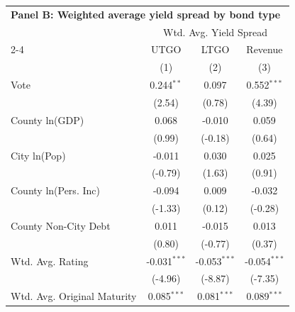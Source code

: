 \begingroup
\centering
\begin{tabular*}{\textwidth}{@{\extracolsep{\fill}}lccc}
\multicolumn{4}{l}{\textbf{Panel B: Weighted average yield spread by bond type}}\\

\addlinespace
   \toprule
 & \multicolumn{3}{c}{Wtd. Avg. Yield Spread}\\
   \cmidrule(lr){2-4}
                               & UTGO                          & LTGO                          & Revenue \\   
                               & (1)                           & (2)                           & (3)\\  
   \midrule 
   Vote                        & 0.244$^{**}$                  & 0.097                         & 0.552$^{***}$\\   
                               & (2.54)                       & (0.78)                       & (4.39)\\   
   County ln(GDP)              & 0.068                         & -0.010                        & 0.059\\   
                               & (0.99)                       & (-0.18)                      & (0.64)\\   
   City ln(Pop)                & -0.011                        & 0.030                         & 0.025\\   
                               & (-0.79)                      & (1.63)                       & (0.91)\\   
   County ln(Pers. Inc)        & -0.094                        & 0.009                         & -0.032\\   
                               & (-1.33)                      & (0.12)                       & (-0.28)\\   
   County Non-City Debt        & 0.011                         & -0.015                        & 0.013\\   
                               & (0.80)                       & (-0.77)                      & (0.37)\\   
   Wtd. Avg. Rating            & -0.031$^{***}$                & -0.053$^{***}$                & -0.054$^{***}$\\   
                               & (-4.96)                      & (-8.87)                      & (-7.35)\\   
   Wtd. Avg. Original Maturity & 0.085$^{***}$                 & 0.081$^{***}$                 & 0.089$^{***}$\\   

\end{tabular*}
